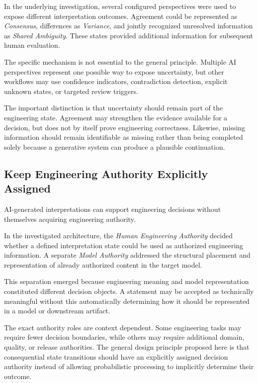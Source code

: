 In the underlying investigation, several configured perspectives were used to expose
different interpretation outcomes. Agreement could be represented as \emph{Consensus},
differences as \emph{Variance}, and jointly recognized unresolved information as
\emph{Shared Ambiguity}. These states provided additional information for subsequent human
evaluation.

The specific mechanism is not essential to the general principle. Multiple AI perspectives
represent one possible way to expose uncertainty, but other workflows may use confidence
indicators, contradiction detection, explicit unknown states, or targeted review triggers.

The important distinction is that uncertainty should remain part of the engineering state.
Agreement may strengthen the evidence available for a decision, but does not by itself prove
engineering correctness. Likewise, missing information should remain identifiable as missing
rather than being completed solely because a generative system can produce a plausible
continuation.

\subsection{Keep Engineering Authority Explicitly Assigned}
\label{sec:principle_authority}

AI-generated interpretations can support engineering decisions without themselves acquiring
engineering authority.

In the investigated architecture, the \emph{Human Engineering Authority} decided whether a
defined interpretation state could be used as authorized engineering information. A separate
\emph{Model Authority} addressed the structural placement and representation of already
authorized content in the target model.

This separation emerged because engineering meaning and model representation constituted
different decision objects. A statement may be accepted as technically meaningful without
this automatically determining how it should be represented in a model or downstream
artifact.

The exact authority roles are context dependent. Some engineering tasks may require fewer
decision boundaries, while others may require additional domain, quality, or release
authorities. The general design principle proposed here is that consequential state
transitions should have an explicitly assigned decision authority instead of allowing
probabilistic processing to implicitly determine their outcome.

